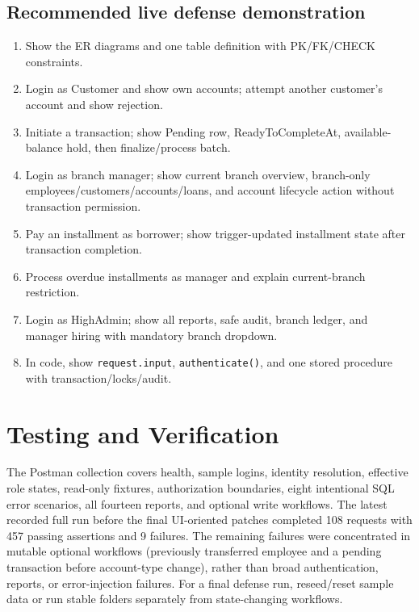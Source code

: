 \documentclass[11pt,a4paper,oneside]{report}
\begin{document}
\section{Recommended live defense demonstration}
\begin{enumerate}
\item Show the ER diagrams and one table definition with PK/FK/CHECK constraints.
\item Login as Customer and show own accounts; attempt another customer's account and show rejection.
\item Initiate a transaction; show Pending row, ReadyToCompleteAt, available-balance hold, then finalize/process batch.
\item Login as branch manager; show current branch overview, branch-only employees/customers/accounts/loans, and account lifecycle action without transaction permission.
\item Pay an installment as borrower; show trigger-updated installment state after transaction completion.
\item Process overdue installments as manager and explain current-branch restriction.
\item Login as HighAdmin; show all reports, safe audit, branch ledger, and manager hiring with mandatory branch dropdown.
\item In code, show \texttt{request.input}, \texttt{authenticate()}, and one stored procedure with transaction/locks/audit.
\end{enumerate}

\chapter{Testing and Verification}
The Postman collection covers health, sample logins, identity resolution, effective role states, read-only fixtures, authorization boundaries, eight intentional SQL error scenarios, all fourteen reports, and optional write workflows. The latest recorded full run before the final UI-oriented patches completed 108 requests with 457 passing assertions and 9 failures. The remaining failures were concentrated in mutable optional workflows (previously transferred employee and a pending transaction before account-type change), rather than broad authentication, reports, or error-injection failures. For a final defense run, reseed/reset sample data or run stable folders separately from state-changing workflows.
\end{document}
